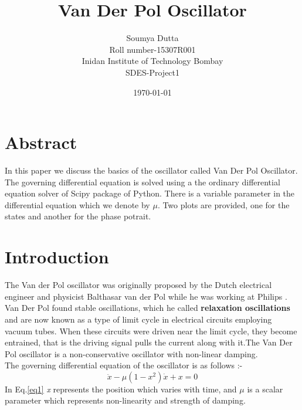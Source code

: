\documentclass[a4paper]{article}
\begin{document}
\title{Van Der Pol Oscillator}
\author{Soumya Dutta\\
Roll number-15307R001\\
Inidan Institute of Technology Bombay\\
SDES-Project1}
\date{\today}
\maketitle
\clearpage
\tableofcontents
\clearpage

\section*{Abstract}
    In this paper we discuss the basics of the oscillator called Van Der Pol Oscillator. The governing differential equation is solved using a
    the ordinary differential equation solver of Scipy package of Python. There is a variable parameter in the differential equation which we
    denote by $\mu$. Two plots are provided, one for the states and another for the phase potrait.

\section{Introduction}
The Van der Pol oscillator was originally proposed by the Dutch electrical engineer and physicist Balthasar van der Pol while he was working at Philips \cite{van}. Van Der Pol found stable oscillations, which he called \textbf{relaxation oscillations} and are now known as a type of limit cycle in electrical circuits employing vacuum tubes. When these circuits were driven near the limit cycle, they become entrained, that is the driving signal pulls the current along with it.The Van Der Pol oscillator is a non-conservative oscillator with non-linear damping. \\
The governing differential equation of the oscillator is as follows :-
\begin{equation}\label{eq1}
    \ddot{x}-\mu (1-x^{2}) \dot{x} + x=0
\end{equation}
In Eq.\ref{eq1} \textit{x} represents the position which varies with time, and $\mu$ is a scalar parameter which represents non-linearity and 
strength of damping.
\end{document}
